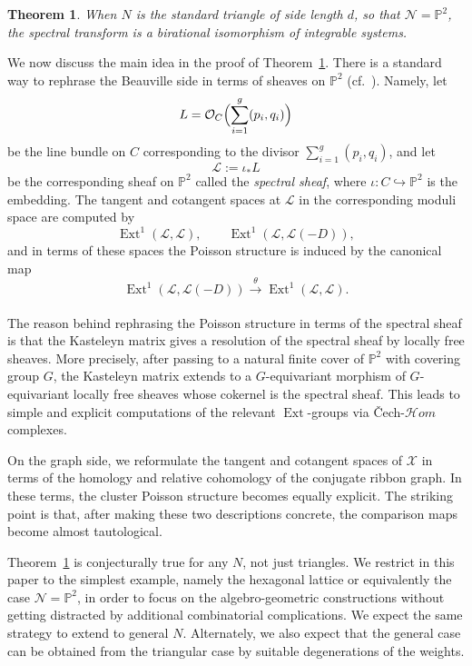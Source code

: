 \documentclass[dvipsnames,11pt]{article}
\newtheorem{theorem}{Theorem}[section]
\theoremstyle{definition}
\renewcommand{\P}{{\mathbb P}}
\def\Ext{\operatorname{Ext}}
\newcommand{\la}{\label}
\def\Ext{\operatorname{Ext}}
\begin{document}
\begin{theorem} \la{thm1}
When $N$ is the standard triangle of side length $d$, so that $\mathcal N = \P^2$, the spectral transform is a birational isomorphism of integrable systems.
\end{theorem}

We now discuss the main idea in the proof of Theorem~\ref{thm1}. There is a standard way to rephrase the Beauville side in terms of sheaves on $\P^2$ (cf.~\cite{Hurtubise, Hurtubise2, HH}). Namely, let
\[
L = \mathcal O_{C}\Bigl(\sum_{i=1}^g (p_i,q_i)\Bigr)
\]
be the line bundle on $C$ corresponding to the divisor $\sum_{i=1}^g (p_i,q_i)$, and let
\[
\mathcal L := \iota_*L
\]
be the corresponding sheaf on $\P^2$ called the \emph{spectral sheaf}, where $\iota : C \hookrightarrow \P^2$ is the embedding. The tangent and cotangent spaces at $\mathcal L$ in the corresponding moduli space are computed by
\[
\Ext^1(\mathcal L,\mathcal L), \qquad \Ext^1(\mathcal L,\mathcal L(-D)),
\]
and in terms of these spaces the Poisson structure is induced by the canonical map
\[
\Ext^1(\mathcal L,\mathcal L(-D)) \xrightarrow[]{\theta} \Ext^1(\mathcal L,\mathcal L).
\]

The reason behind rephrasing the Poisson structure in terms of the spectral sheaf is that the Kasteleyn matrix gives a resolution of the spectral sheaf by locally free sheaves. More precisely, after passing to a natural finite cover of $\P^2$ with covering group $G$, the Kasteleyn matrix extends to a $G$-equivariant morphism of $G$-equivariant locally free sheaves whose cokernel is the spectral sheaf. This leads to simple and explicit computations of the relevant $\Ext$-groups via \v{C}ech-$\mathcal Hom$ complexes.

On the graph side, we reformulate the tangent and cotangent spaces of $\mathcal X$ in terms of the homology and relative cohomology of the conjugate ribbon graph. In these terms, the cluster Poisson structure becomes equally explicit. The striking point is that, after making these two descriptions concrete, the comparison maps become almost tautological.

Theorem~\ref{thm1} is conjecturally true for any $N$, not just triangles. We restrict in this paper to the simplest example, namely the hexagonal lattice or equivalently the case $\mathcal N=\P^2$, in order to focus on the algebro-geometric constructions without getting distracted by additional combinatorial complications. We expect the same strategy to extend to general $N$. Alternately, we also expect that the general case can be obtained from the triangular case by suitable degenerations of the weights.
\end{document}

